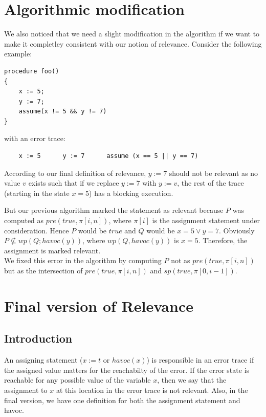 \documentclass{article}
\begin{document}
\section{Algorithmic modification}
We also noticed that we need a slight modification in the algorithm if we want to make it completley consistent with our notion of relevance. Consider the following example:
\begin{lstlisting}
procedure foo()
{
	x := 5;
	y := 7;
	assume(x != 5 && y != 7)
}
\end{lstlisting}
with an error trace:
\begin{lstlisting}
	x := 5		y := 7		assume (x == 5 || y == 7) 
\end{lstlisting}
According to our final definition of relevance, $y:=7$ should not be relevant as no value $v$ exists such that if we replace $y:=7$ with $y:=v$, the rest of the trace (starting in the state $x=5$) has a blocking execution. 

But our previous algorithm marked the statement as relevant because $P$ was computed as $pre(true, \pi[i,n])$, where $\pi[i]$ is the assignment statement under consideration. Hence $P$ would be $true$ and $Q$ would be $x=5 \vee y=7$. Obviously $P \not \subseteq wp(Q; havoc(y))$, where $wp(Q, havoc(y))$ is $x=5$. Therefore, the assignment is marked relevant. \\
We fixed this error in the algorithm by computing $P$ not as $pre(true, \pi[i,n])$ but as the intersection of $pre(true, \pi[i,n])$ and $sp(true, \pi[0,i-1])$.




\section{Final version of Relevance}
\subsection{Introduction}
An assigning statement ($x := t$ or $havoc(x)$) is responsible in an error trace if the assigned value matters for the reachabilty of the error. If the error state is reachable for any possible value of the variable $x$, then we say that the assignment to $x$ at this location in the error trace is not relevant. Also, in the final version, we have one definition for both the assignment statement and havoc. 
\end{document}
